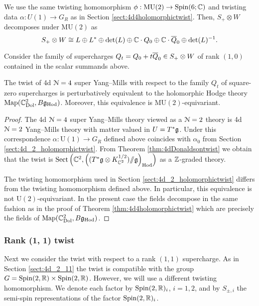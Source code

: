 \documentclass[10pt, oneside]{article}
\newcommand{\Hod}{\mathrm{Hod}}
\newcommand{\MU}{\mathrm{MU}}
\newcommand{\Sect}{\mathrm{Sect}}
\renewcommand{\U}{\mathrm{U}}
\newcommand{\ham}{/\!\!/}
\begin{document}
We use the same twisting homomorphism $\phi : \MU(2) \to \Spin(6;\CC)$ and twisting data $\alpha : U(1) \to G_R$ as in Section \ref{sect:4d4holomorphictwist}.
Then, $S_+ \otimes W$ decomposes nuder $\MU(2)$ as
\[
S_+\otimes W\cong L\oplus L^*\oplus \det(L)\oplus \CC \cdot Q_0 \oplus \CC \cdot \Bar{Q}_0 \oplus \det(L)^{-1}.
\]

Consider the family of supercharges $Q_t = Q_0 + t \Bar{Q}_0 \in S_+\otimes W$ of rank $(1, 0)$ contained in the scalar summands above.

\begin{theorem}
The twist of 4d $\cN=4$ super Yang--Mills with respect to the family $Q_t$ of square-zero supercharges is perturbatively equivalent to the holomorphic Hodge theory $\map(\CC^2_{\rm Dol}, B \fg_{\rm Hod})$. 
Moreover, this equivalence is $\MU(2)$-equivariant.
\label{thm:4d4Atwist}
\end{theorem}
\begin{proof}
The 4d $\cN=4$ super Yang--Mills theory viewed as a $\cN=2$ theory is 4d $\cN=2$ Yang--Mills theory with matter valued in $U=T^*\fg$. 
Under this correspondence $\alpha\colon \U(1)\rightarrow G_R$ defined above coincides with $\alpha_0$ from Section \ref{sect:4d_2_holomorphictwist}. 
From Theorem \ref{thm:4dDonaldsontwist} we obtain that the twist is $\Sect\left(\CC^2, \left((T^*\fg \otimes K_{\CC^2}^{1/2})\ham \fg\right)_{\Hod}\right)$ as a $\ZZ$-graded theory. 

The twisting homomorphism used in Section \ref{sect:4d_2_holomorphictwist} differs from the twisting homomorphism defined above. 
In particular, this equivalence is not $\U(2)$-equivariant. In the present case the fields decompose in the same fashion as in the proof of Theorem \ref{thm:4d4holomorphictwist} which are precisely the fields of $\map(\CC^2_{\rm Dol}, B \fg_{\rm Hod})$.
\end{proof}

\subsubsection{Rank (1, 1) twist}
\label{sect:4d4partialtwist}

Next we consider the twist with respect to a rank $(1,1)$ supercharge. As in Section \ref{sect:4d_2_11} the twist is compatible with the group $G = \Spin(2, \RR) \times \Spin(2, \RR)$. However, we will use a different twisting homomorphism. We denote each factor by $\Spin(2, \RR)_i$, $i=1,2$, and by $S_{\pm, i}$ the semi-spin representations of the factor $\Spin(2, \RR)_i$.
\end{document}
